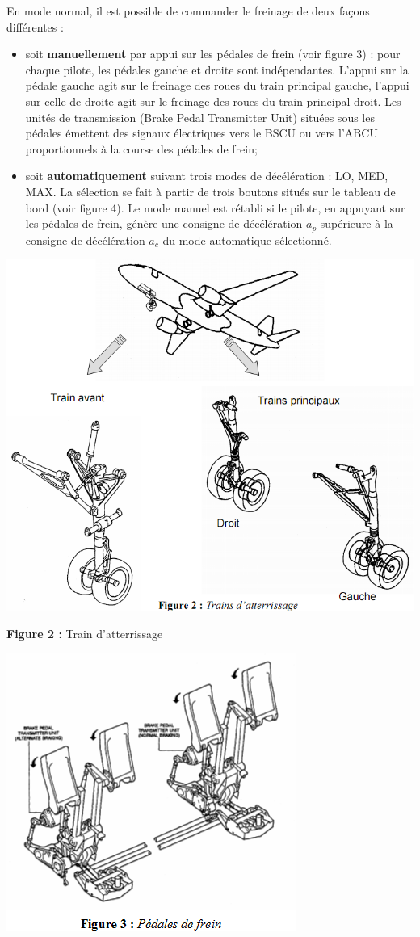 \documentclass[10pt,oneside]{article}
\begin{document}
En mode normal, il est possible de commander le freinage de deux façons
différentes :
\begin{itemize}
 \item soit \textbf{manuellement} par appui sur les pédales de frein (voir
figure 3) : pour chaque pilote, les
         pédales gauche et droite sont indépendantes. L’appui sur la pédale
gauche agit sur le freinage des
         roues du train principal gauche, l’appui sur celle de droite agit sur
le freinage des roues du train
         principal droit. Les unités de transmission (Brake Pedal Transmitter
Unit) situées sous les pédales
         émettent des signaux électriques vers le BSCU ou vers l’ABCU
proportionnels à la course des
         pédales de frein;
\item soit \textbf{automatiquement} suivant trois modes de décélération : LO,
MED, MAX. La sélection se fait
         à partir de trois boutons situés sur le tableau de bord (voir figure
4). Le mode manuel est rétabli si
         le pilote, en appuyant sur les pédales de frein, génère une consigne de
décélération $a_p$ supérieure à
         la consigne de décélération $a_c$ du mode automatique sélectionné.
\end{itemize}                                                    


\begin{center}
\includegraphics[width=.6\textwidth]{png/image2.png}

\textbf{Figure 2 :} Train d'atterrissage
\end{center}

\begin{center}
\includegraphics[width=.5\textwidth]{png/image3.png}
\end{center}
   
\end{document}

